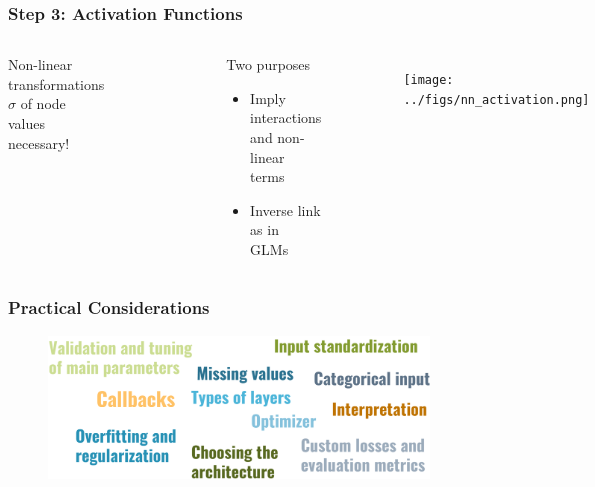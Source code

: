 \documentclass[
    utf8,
    aspectratio=169
]{beamer}  %
\begin{document}
\begin{frame}
	\frametitle{Step 3: Activation Functions}
	\begin{columns}
		Non-linear transformations $\sigma$ of node values necessary!
		\begin{figure}
			\includegraphics[width=0.8\textwidth]{pics/activation_functions.png}
		\end{figure}
	
		\begin{block}{Two purposes}
			\begin{itemize}
				\item Imply interactions and non-linear terms
				\item Inverse link as in GLMs
			\end{itemize}
		\end{block}
		\begin{example}
		\end{example}
		\begin{figure}
			\texttt{[image: ../figs/nn\_activation.png]}
		\end{figure}
	\end{columns}
\end{frame}

\begin{frame}
	\frametitle{Practical Considerations}
	\begin{figure}
		\includegraphics[width=0.9\textwidth]{pics/nn_practical.png}
	\end{figure}
\end{frame}
\end{document}
